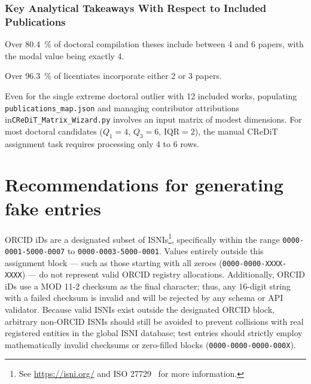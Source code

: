 \documentclass[12pt, twoside]{article}
\newcommand{\fname}[1]{\texttt{#1}}
\begin{document}
\subsubsection{Key Analytical Takeaways With Respect to Included Publications}
\begin{description}[style=nextline, labelwidth=\widthof{\textbf{CReDiT Tooling Workload}}, leftmargin=!]
\item[Compact Scaling Envelope] Over \qty{80.4}{\percent} of doctoral compilation theses include between 4 and 6 papers, with the modal value being exactly 4.

\item[Licentiate Norm] Over \qty{96.3}{\percent} of licentiates incorporate either 2 or 3 papers.

\item[CReDiT Tooling Workload] Even for the single extreme doctoral outlier with 12 included works, populating \fname{publications\_map.json} and managing contributor attributions in\linebreak[4] \texttt{CReDiT\_Matrix\_Wizard.py} involves an input matrix of modest dimensions. For most doctoral candidates ($Q_1 = 4$, $Q_3 = 6$, $\mathrm{IQR} = 2$), the manual CReDiT assignment task requires processing only 4 to 6 rows.
\end{description}


\section{Recommendations for generating fake \BibLaTeX{} entries}
\label{sec:generatingFakeBibLaTeXEntries}

\gls{ORCID} iDs are a designated subset of \glspl{ISNI}\footnote{See \url{https://isni.org/} and \gls{ISO} 27729~\cite{iso27729:2024} for more information.}, specifically within the range \texttt{0000-0001-5000-0007} to \texttt{0000-0003-5000-0001}. Values entirely outside this assignment block --- such as those starting with all zeroes (\texttt{0000-0000-XXXX-XXXX}) --- do not represent valid \gls{ORCID} registry allocations. Additionally, \gls{ORCID} iDs use a MOD 11-2 checksum as the final character; thus, any 16-digit string with a failed checksum is invalid and will be rejected by any schema or \gls{API} validator. Because valid \glspl{ISNI} exist outside the designated \gls{ORCID} block, arbitrary non-ORCID \glspl{ISNI} should still be avoided to prevent collisions with real registered entities in the global \gls{ISNI} database; test entries should strictly employ mathematically invalid checksums or zero-filled blocks (\eg \texttt{0000-0000-0000-000X}).
\end{document}
